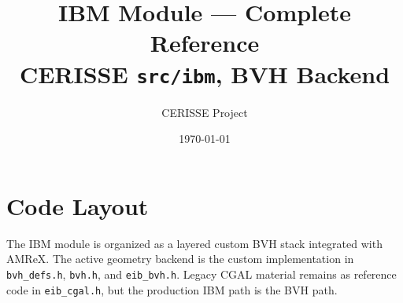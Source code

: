 \documentclass[11pt,a4paper]{article}
\title{\textbf{IBM Module --- Complete Reference}\\[0.5ex]
  \large CERISSE \texttt{src/ibm}, BVH Backend}
\author{CERISSE Project}
\date{\today}
\begin{document}
\maketitle
\tableofcontents
\newpage

\section{Code Layout}

The IBM module is organized as a layered custom BVH stack integrated with AMReX.
The active geometry backend is the custom implementation in \texttt{bvh\_defs.h},
\texttt{bvh.h}, and \texttt{eib\_bvh.h}. Legacy CGAL material remains as reference
code in \texttt{eib\_cgal.h}, but the production IBM path is the BVH path.
\end{document}
